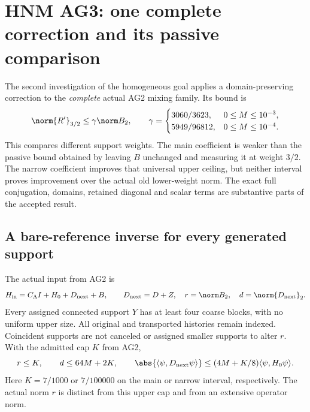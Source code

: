 \section{HNM AG3: one complete correction and its passive comparison\workstar}
The second investigation of the homogeneous goal applies a domain-preserving correction to the \emph{complete} actual AG2 mixing family. Its bound is
\begin{equation}
 \norm{R'}_{3/2}\le\gamma\norm B_2,
 \qquad
 \gamma=\begin{cases}3060/3623,&0\le M\le10^{-3},\\
 5949/96812,&0\le M\le10^{-4}.
 \end{cases}
 \label{r28:eq:ag3-headline}
\end{equation}
This compares different support weights. The main coefficient is weaker than the passive bound obtained by leaving $B$ unchanged and measuring it at weight $3/2$. The narrow coefficient improves that universal upper ceiling, but neither interval proves improvement over the actual old lower-weight norm. The exact full conjugation, domains, retained diagonal and scalar terms are substantive parts of the accepted result.

\subsection{A bare-reference inverse for every generated support}
The actual input from AG2 is
\begin{equation}
 H_{\rm in}=C_\Lambda I+H_0+D_{\rm next}+B,\qquad
 D_{\rm next}=D+Z,\quad r=\norm B_2,\quad d=\norm{D_{\rm next}}_2.
 \label{r28:eq:ag3-input}
\end{equation}
Every assigned connected support $Y$ has at least four coarse blocks, with no uniform upper size. All original and transported histories remain indexed. Coincident supports are not canceled or assigned smaller supports to alter $r$. With the admitted cap $K$ from AG2,
\begin{equation}
 r\le K,\qquad d\le64M+2K,\qquad
 \abs{\langle\psi,D_{\rm next}\psi\rangle}
 \le(4M+K/8)\langle\psi,H_0\psi\rangle.
 \label{r28:eq:ag3-input-budgets}
\end{equation}
Here $K=7/1000$ or $7/100000$ on the main or narrow interval, respectively. The actual norm $r$ is distinct from this upper cap and from an extensive operator norm.


